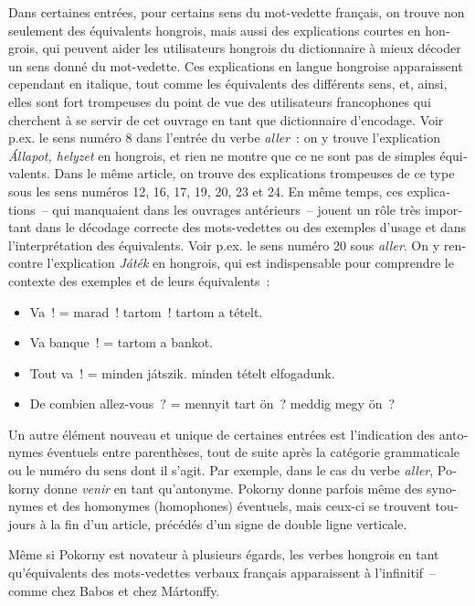\documentclass[output=paper,colorlinks,citecolor=brown,arabicfont,chinesefont,booklanguage=french]{langscibook}
\begin{document}
\begin{otherlanguage}{french}
Dans certaines entrées, pour certains sens du mot-vedette français, on trouve non seulement des équivalents hongrois, mais aussi des explications courtes en hongrois, qui peuvent aider les utilisateurs hongrois du dictionnaire à mieux décoder un sens donné du mot-vedette. Ces explications en langue hongroise apparaissent cependant en italique, tout comme les équivalents des différents sens, et, ainsi, elles sont fort trompeuses du point de vue des utilisateurs francophones qui cherchent à se servir de cet ouvrage en tant que dictionnaire d’encodage. Voir p.ex. le sens numéro 8 dans l’entrée du verbe \emph{aller}~: on y trouve l’explication \emph{Állapot, helyzet}  en hongrois, et rien ne montre que ce ne sont pas de simples équivalents. Dans le même article, on trouve des explications trompeuses de ce type sous les sens numéros 12, 16, 17, 19, 20, 23 et 24. En même temps, ces explications~-- qui manquaient dans les ouvrages antérieurs~-- jouent un rôle très important dans le décodage correcte des mots-vedettes ou des exemples d’usage et dans l’interprétation des équivalents. Voir p.ex. le sens numéro 20 sous \emph{aller}. On y rencontre l’explication \emph{Játék}  en hongrois, qui est indispensable pour comprendre le contexte des exemples et de leurs équivalents~:

\begin{itemize}
    \item Va~! = marad~! tartom~! tartom a tételt.
    \item Va banque~! = tartom a bankot.
    \item Tout va~! = minden játszik. minden tételt elfogadunk.
    \item De combien allez-vous~? = mennyit tart ön~? meddig megy ön~?
\end{itemize}

Un autre élément nouveau et unique de certaines entrées est l’indication des antonymes éventuels entre parenthèses, tout de suite après la catégorie grammaticale ou le numéro du sens dont il s’agit. Par exemple, dans le cas du verbe \emph{aller}, Pokorny donne \emph{venir} en tant qu’antonyme. Pokorny donne parfois même des synonymes et des homonymes (homophones) éventuels, mais ceux-ci se trouvent toujours à la fin d’un article, précédés d’un signe de double ligne verticale.

Même si Pokorny est novateur à plusieurs égards, les verbes hongrois en tant qu’équivalents des mots-vedettes verbaux français apparaissent à l’infinitif~-- comme chez Babos et chez Mártonffy. 


\end{otherlanguage}
\end{document}

